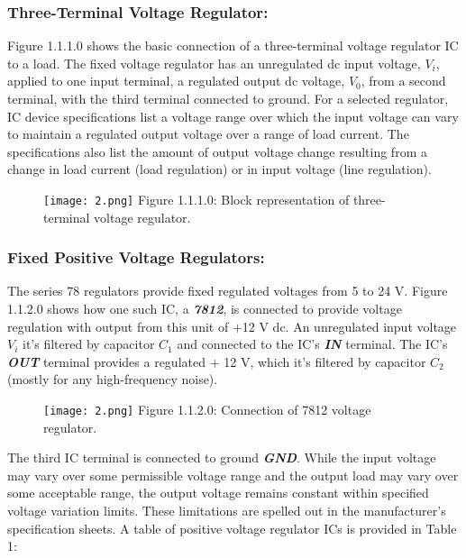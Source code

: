 \subsubsection{Three-Terminal Voltage Regulator:}

\begin{multicols}{2}
Figure 1.1.1.0 shows the basic connection of a three-terminal voltage regulator IC to a load. The fixed voltage regulator has an unregulated dc input voltage, $V_{i}$, applied to one input terminal, a regulated output dc voltage, $V_{0}$, from a second terminal, with the third terminal connected to ground. For a selected regulator, IC device specifications list a voltage range over which the input voltage can vary to maintain a regulated output voltage over a range of load current. The specifications also list the amount of output voltage change resulting from a change in load current (load regulation) or in input voltage (line regulation).

\begin{figure}[H]
\texttt{[image: 2.png]}
\centering \linebreak \linebreak Figure 1.1.1.0: Block representation of three-terminal voltage regulator.
\end{figure}
\end{multicols}

\pagebreak

\subsubsection{Fixed Positive Voltage Regulators:}

The series 78 regulators provide fixed regulated voltages from 5 to 24 V. Figure 1.1.2.0 shows how one such IC, a {\bfseries\itshape 7812}, is connected to provide voltage regulation with output from this unit of $+$12 V dc. An unregulated input voltage $V_{i}$ it's filtered by capacitor $C_{1}$ and connected to the IC’s {\bfseries\itshape IN} terminal. The IC’s {\bfseries\itshape OUT} terminal provides a regulated $+$ 12 V, which it's filtered by capacitor $C_{2}$ (mostly for any high-frequency noise). \hfill

\begin{multicols}{2}
\begin{figure}[H]
\texttt{[image: 2.png]}
\centering \linebreak \linebreak Figure 1.1.2.0: Connection of 7812 voltage regulator.
\end{figure} \hfill \break \break

The third IC terminal is connected to ground {\bfseries\itshape GND}. While the input voltage may vary over some permissible voltage range and the output load may vary over some acceptable range, the output voltage remains constant within specified voltage variation limits. These limitations are spelled out in the manufacturer's specification sheets. A table of positive voltage regulator ICs is provided in Table 1: 
\end{multicols} \hfill

